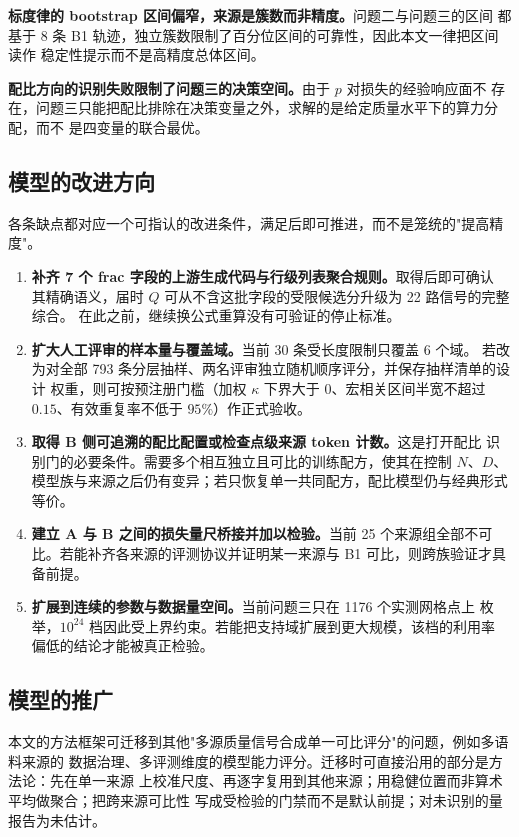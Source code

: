\documentclass[bwprint]{gmcmthesis}
\numberwithin{equation}{section}
\numberwithin{figure}{section}
\numberwithin{table}{section}
\begin{document}
\textbf{标度律的 bootstrap 区间偏窄，来源是簇数而非精度。}问题二与问题三的区间
都基于 8 条 B1 轨迹，独立簇数限制了百分位区间的可靠性，因此本文一律把区间读作
稳定性提示而不是高精度总体区间。

\textbf{配比方向的识别失败限制了问题三的决策空间。}由于 $p$ 对损失的经验响应面不
存在，问题三只能把配比排除在决策变量之外，求解的是给定质量水平下的算力分配，而不
是四变量的联合最优。

\subsection{模型的改进方向}

各条缺点都对应一个可指认的改进条件，满足后即可推进，而不是笼统的"提高精度"。

\begin{enumerate}
\item \textbf{补齐 7 个 frac 字段的上游生成代码与行级列表聚合规则。}取得后即可确认
      其精确语义，届时 $Q$ 可从不含这批字段的受限候选分升级为 22 路信号的完整综合。
      在此之前，继续换公式重算没有可验证的停止标准。
\item \textbf{扩大人工评审的样本量与覆盖域。}当前 30 条受长度限制只覆盖 6 个域。
      若改为对全部 793 条分层抽样、两名评审独立随机顺序评分，并保存抽样清单的设计
      权重，则可按预注册门槛（加权 $\kappa$ 下界大于 0、宏相关区间半宽不超过
      $0.15$、有效重复率不低于 $95\%$）作正式验收。
\item \textbf{取得 B 侧可追溯的配比配置或检查点级来源 token 计数。}这是打开配比
      识别门的必要条件。需要多个相互独立且可比的训练配方，使其在控制 $N$、$D$、
      模型族与来源之后仍有变异；若只恢复单一共同配方，配比模型仍与经典形式等价。
\item \textbf{建立 A 与 B 之间的损失量尺桥接并加以检验。}当前 25 个来源组全部不可
      比。若能补齐各来源的评测协议并证明某一来源与 B1 可比，则跨族验证才具备前提。
\item \textbf{扩展到连续的参数与数据量空间。}当前问题三只在 1176 个实测网格点上
      枚举，$10^{24}$ 档因此受上界约束。若能把支持域扩展到更大规模，该档的利用率
      偏低的结论才能被真正检验。
\end{enumerate}

\subsection{模型的推广}

本文的方法框架可迁移到其他"多源质量信号合成单一可比评分"的问题，例如多语料来源的
数据治理、多评测维度的模型能力评分。迁移时可直接沿用的部分是方法论：先在单一来源
上校准尺度、再逐字复用到其他来源；用稳健位置而非算术平均做聚合；把跨来源可比性
写成受检验的门禁而不是默认前提；对未识别的量报告为未估计。
\end{document}

